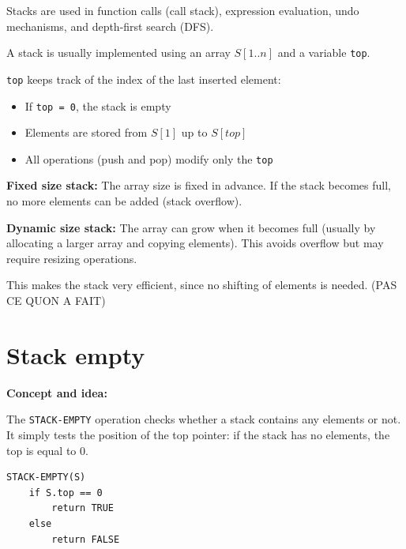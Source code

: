 \documentclass[11pt,a4paper,openany]{book}
\begin{document}
\begin{defnbox}[title=Applications]
Stacks are used in function calls (call stack), expression evaluation, undo mechanisms, and depth-first search (DFS).
\end{defnbox}


\begin{defnbox}[title=Stack implementation (how it is stored)]
A stack is usually implemented using an array $S[1..n]$ and a variable \texttt{top}.

\texttt{top} keeps track of the index of the last inserted element:
\begin{itemize}
    \item If \texttt{top = 0}, the stack is empty
    \item Elements are stored from $S[1]$ up to $S[top]$
    \item All operations (push and pop) modify only the \texttt{top}
\end{itemize}

\textbf{Fixed size stack:}
The array size is fixed in advance. If the stack becomes full, no more elements can be added (stack overflow).

\textbf{Dynamic size stack:}
The array can grow when it becomes full (usually by allocating a larger array and copying elements). This avoids overflow but may require resizing operations.

This makes the stack very efficient, since no shifting of elements is needed. (PAS CE QUON A FAIT)
\end{defnbox}












\vspace{2cm}








\section{Stack empty}
\textbf{Concept and idea:}

The \texttt{STACK-EMPTY} operation checks whether a stack contains any elements or not.  
It simply tests the position of the top pointer: if the stack has no elements, the top is equal to 0.

\begin{lstlisting}
STACK-EMPTY(S)
    if S.top == 0
        return TRUE
    else
        return FALSE
\end{lstlisting}
\end{document}
